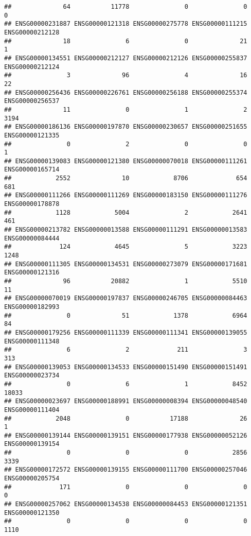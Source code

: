 \documentclass[
]{article}
\begin{document}
\begin{verbatim}
##              64           11778               0               0               0 
## ENSG00000231887 ENSG00000121318 ENSG00000275778 ENSG00000111215 ENSG00000212128 
##              18               6               0              21               1 
## ENSG00000134551 ENSG00000212127 ENSG00000212126 ENSG00000255837 ENSG00000212124 
##               3              96               4              16              22 
## ENSG00000256436 ENSG00000226761 ENSG00000256188 ENSG00000255374 ENSG00000256537 
##              11               0               1               2            3194 
## ENSG00000186136 ENSG00000197870 ENSG00000230657 ENSG00000251655 ENSG00000121335 
##               0               2               0               0               1 
## ENSG00000139083 ENSG00000121380 ENSG00000070018 ENSG00000111261 ENSG00000165714 
##            2552              10            8706             654             681 
## ENSG00000111266 ENSG00000111269 ENSG00000183150 ENSG00000111276 ENSG00000178878 
##            1128            5004               2            2641             461 
## ENSG00000213782 ENSG00000013588 ENSG00000111291 ENSG00000013583 ENSG00000084444 
##             124            4645               5            3223            1248 
## ENSG00000111305 ENSG00000134531 ENSG00000273079 ENSG00000171681 ENSG00000121316 
##              96           20882               1            5510              11 
## ENSG00000070019 ENSG00000197837 ENSG00000246705 ENSG00000084463 ENSG00000182993 
##               0              51            1378            6964              84 
## ENSG00000179256 ENSG00000111339 ENSG00000111341 ENSG00000139055 ENSG00000111348 
##               6               2             211               3             313 
## ENSG00000139053 ENSG00000134533 ENSG00000151490 ENSG00000151491 ENSG00000023734 
##               0               6               1            8452           18033 
## ENSG00000023697 ENSG00000188991 ENSG00000008394 ENSG00000048540 ENSG00000111404 
##            2048               0           17188              26               1 
## ENSG00000139144 ENSG00000139151 ENSG00000177938 ENSG00000052126 ENSG00000139154 
##               0               0               0            2856            3339 
## ENSG00000172572 ENSG00000139155 ENSG00000111700 ENSG00000257046 ENSG00000205754 
##             171               0               0               0               0 
## ENSG00000257062 ENSG00000134538 ENSG00000084453 ENSG00000121351 ENSG00000121350 
##               0               0               0               0            1110 

\end{verbatim}
\end{document}
